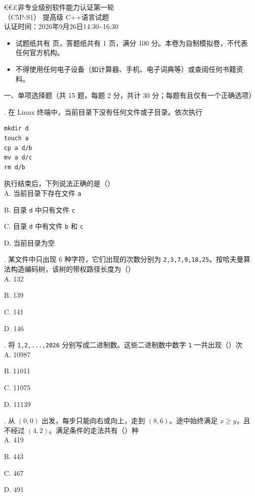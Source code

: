 \documentclass[a4paper]{ctexart}
\newcommand{\wdot}{{\fontsize{12}{12}\selectfont\textbullet}}
\newcommand{\bigtitle}[1]{\noindent\heiti #1\par\vspace{2pt}}
\newcommand{\q}[1]{\noindent #1}
\newcommand{\opt}[1]{\hspace*{2em} #1\par}
\begin{document}
\begin{center}
{\dengxian
    {\fontsize{15.95}{1} €€£非专业级别软件能力认证第一轮} \\[1.5em]
    {\fontsize{15.95}{1}\selectfont （C5P-S1） 提高级 C++\hspace{0pt}语言试题} \\[1.5em]
    {\fontsize{14.05}{1}\selectfont 认证时间：2026年9月26日14:30\textasciitilde16:30}
}
\end{center}

\vspace{8pt}
\begin{itemize}[leftmargin=2.6em, itemsep=1pt, label={}]
    \item \wdot\hspace{0.5em}试题纸共有 \pageref{LastPage} 页，答题纸共有 1 页，满分 100 分。本卷为自制模拟卷，不代表任何官方机构。
    \item \wdot\hspace{0.5em}不得使用任何电子设备（如计算器、手机、电子词典等）或查阅任何书籍资料。
\end{itemize}

\bigtitle{一、单项选择题（共 15 题，每题 2 分，共计 30 分；每题有且仅有一个正确选项）}

\q{1.} 在 Linux 终端中，当前目录下没有任何文件或子目录。依次执行
\begin{codebox}\begin{lstlisting}
mkdir d
touch a
cp a d/b
mv a d/c
rm d/b
\end{lstlisting}\end{codebox}
执行结束后，下列说法正确的是（\qquad）\\
\opt{A. 当前目录下存在文件 \texttt{a}}
\opt{B. 目录 \texttt{d} 中只有文件 \texttt{c}}
\opt{C. 目录 \texttt{d} 中有文件 \texttt{b} 和 \texttt{c}}
\opt{D. 当前目录为空}

\q{2.} 某文件中只出现 6 种字符，它们出现的次数分别为 \texttt{2,3,7,9,18,25}。按哈夫曼算法构造编码树，该树的带权路径长度为（\qquad）\\
\opt{A. 132}\opt{B. 139}\opt{C. 141}\opt{D. 146}

\q{3.} 将 \texttt{1,2,...,2026} 分别写成二进制数。这些二进制数中数字 \texttt{1} 一共出现（\qquad）次\\
\opt{A. 10987}\opt{B. 11011}\opt{C. 11075}\opt{D. 11139}

\q{4.} 从 \((0,0)\) 出发，每步只能向右或向上，走到 \((8,6)\)。途中始终满足 \(x\ge y\)，且不经过 \((4,2)\)。满足条件的走法共有（\qquad）种\\
\opt{A. 419}\opt{B. 443}\opt{C. 467}\opt{D. 491}
\end{document}
